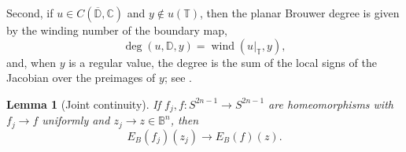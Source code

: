 \documentclass[11pt]{article}
\newtheorem{lemma}[theorem]{Lemma}
\theoremstyle{definition}
\theoremstyle{remark}
\theoremstyle{definition}
\newcommand{\B}{\mathbb B}
\newcommand{\C}{\mathbb C}
\newcommand{\D}{\mathbb D}
\newcommand{\T}{\mathbb T}
\newcommand{\wind}{\operatorname{wind}}
\begin{document}
Second, if \(u\in C(\overline{\D},\C)\) and \(y\notin u(\T)\), then the planar
Brouwer degree is given by the winding number of the boundary map,
\begin{equation}\label{eq:degree-winding}
    \deg(u,\D,y)=\wind(u|_{\T},y),
\end{equation}
and, when \(y\) is a regular value, the degree is the sum of the local signs
of the Jacobian over the preimages of \(y\); see
\cite[Chapter~1]{Deimling1985}.

\begin{lemma}[Joint continuity]
\label{lemma-joint-continuity-barycentric}
If \(f_j,f:S^{2n-1}\to S^{2n-1}\) are homeomorphisms with
\(f_j\to f\) uniformly and \(z_j\to z\in\B^n\), then
\[
        E_B(f_j)(z_j)\longrightarrow E_B(f)(z).
\]
\end{lemma}
\end{document}
